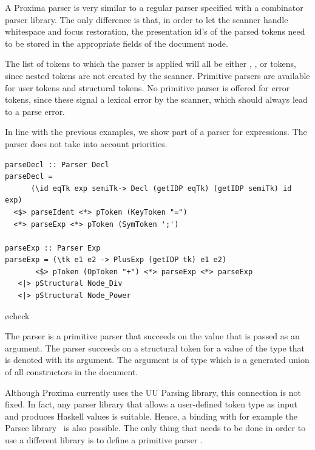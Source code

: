 \documentclass[12pt]{article}
\begin{document}
A Proxima parser is very similar to a regular parser specified with a combinator parser library. The only difference is that, in order to let the scanner handle whitespace and focus restoration, the presentation id's of the parsed tokens need to be stored in the appropriate fields of the document node. 

The list of tokens to which the parser is applied will all be either , , or  tokens, since nested  tokens are not created by the scanner. Primitive parsers are available for user tokens and structural tokens. No primitive parser is offered for error tokens, since these signal a lexical error by the scanner, which should always lead to a parse error.

In line with the previous examples, we show part of a parser for expressions. The parser does not take into account priorities.

\begin{footnotesize}
\begin{verbatim}
parseDecl :: Parser Decl
parseDecl = 
      (\id eqTk exp semiTk-> Decl (getIDP eqTk) (getIDP semiTk) id exp)
  <$> parseIdent <*> pToken (KeyToken "=") 
  <*> parseExp <*> pToken (SymToken ';')
       
parseExp :: Parser Exp
parseExp = (\tk e1 e2 -> PlusExp (getIDP tk) e1 e2)
       <$> pToken (OpToken "+") <*> parseExp <*> parseExp
   <|> pStructural Node_Div
   <|> pStructural Node_Power
\end{verbatim}
\end{footnotesize}
\bl
\o check
\el

The  parser is a primitive parser that succeeds on the  value that is passed as an argument. The  parser succeeds on a structural token for a value of the type that is denoted with its argument. The argument is of type  which is a generated union of all constructors in the document. 

Although Proxima currently uses the UU Parsing library, this connection is not fixed. In fact, any  parser library that allows a user-defined token type as input and produces Haskell values is suitable. Hence, a binding with for example the Parsec library~\cite{leijen08parsec} is also possible. The only thing that needs to be done in order to use a different library is to define a primitive parser .
\end{document}

